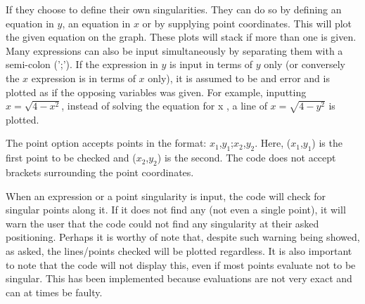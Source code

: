 \documentclass[11]{report}
\begin{document}
If they choose to define their own singularities. They can do so by defining an equation in $y$, an equation in $x$ or by supplying point coordinates. This will plot the given equation on the graph. These plots will stack if more than one is given. Many expressions can also be input simultaneously by separating them with a semi-colon (';'). If the expression in $y$ is input in terms of $y$ only (or conversely the $x$ expression is in terms of $x$ only), it is assumed to be and error and is plotted as if the opposing variables was given. For example, inputting $x = \sqrt{4 - x^2}$, instead of solving the equation for x , a line of $x = \sqrt{4 - y^2}$ is plotted.

The point option accepts points in the format: $x_1$,$y_1$;$x_2$,$y_2$. Here, ($x_1$,$y_1$) is the first point to be checked and ($x_2$,$y_2$) is the second. The code does not accept brackets surrounding the point coordinates.

When an expression or a point singularity is input, the code will check for singular points along it. If it does not find any (not even a single point), it will warn the user that the code could not find any singularity at their asked positioning. Perhaps it is worthy of note that, despite such warning being showed, as asked, the lines/points checked will be plotted regardless. It is also important to note that the code will not display this, even if most points evaluate not to be singular. This has been implemented because evaluations are not very exact and can at times be faulty.
\end{document}
